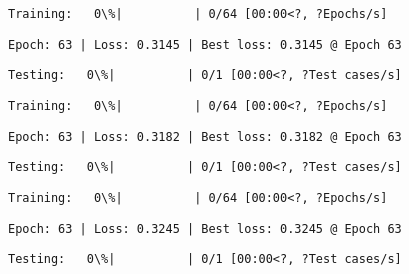 \documentclass[11pt]{article}
\begin{document}
    
    
    \begin{Verbatim}[commandchars=\\\{\}]
Training:   0\%|          | 0/64 [00:00<?, ?Epochs/s]
    \end{Verbatim}

    
    \begin{Verbatim}[commandchars=\\\{\}]
Epoch: 63 | Loss: 0.3145 | Best loss: 0.3145 @ Epoch 63
    \end{Verbatim}

    
    \begin{Verbatim}[commandchars=\\\{\}]
Testing:   0\%|          | 0/1 [00:00<?, ?Test cases/s]
    \end{Verbatim}

    
    
    \begin{Verbatim}[commandchars=\\\{\}]
Training:   0\%|          | 0/64 [00:00<?, ?Epochs/s]
    \end{Verbatim}

    
    \begin{Verbatim}[commandchars=\\\{\}]
Epoch: 63 | Loss: 0.3182 | Best loss: 0.3182 @ Epoch 63
    \end{Verbatim}

    
    \begin{Verbatim}[commandchars=\\\{\}]
Testing:   0\%|          | 0/1 [00:00<?, ?Test cases/s]
    \end{Verbatim}

    
    
    \begin{Verbatim}[commandchars=\\\{\}]
Training:   0\%|          | 0/64 [00:00<?, ?Epochs/s]
    \end{Verbatim}

    
    \begin{Verbatim}[commandchars=\\\{\}]
Epoch: 63 | Loss: 0.3245 | Best loss: 0.3245 @ Epoch 63
    \end{Verbatim}

    
    \begin{Verbatim}[commandchars=\\\{\}]
Testing:   0\%|          | 0/1 [00:00<?, ?Test cases/s]
    \end{Verbatim}
\end{document}
